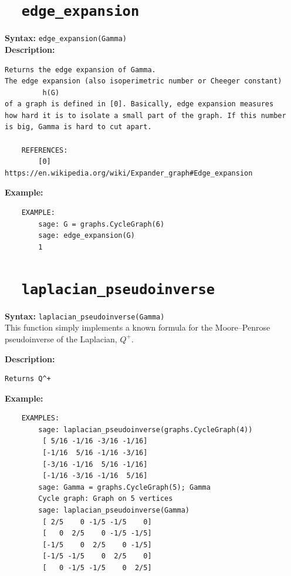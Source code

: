 \documentclass{article}
\begin{document}
\section{\tt \ \ edge\_expansion}

\textbf{Syntax:} \verb}edge_expansion(Gamma)}\\

\textbf{Description:}
\begin{verbatim}
Returns the edge expansion of Gamma.
The edge expansion (also isoperimetric number or Cheeger constant) 
         h(G) 
of a graph is defined in [0]. Basically, edge expansion measures 
how hard it is to isolate a small part of the graph. If this number 
is big, Gamma is hard to cut apart. 

    REFERENCES:
        [0] https://en.wikipedia.org/wiki/Expander_graph#Edge_expansion
\end{verbatim}

\textbf{Example:}
\begin{verbatim}
    EXAMPLE:
        sage: G = graphs.CycleGraph(6)
        sage: edge_expansion(G)
        1
\end{verbatim}

\section{\tt \ \ laplacian\_pseudoinverse}

\textbf{Syntax:} \verb}laplacian_pseudoinverse(Gamma)}\\

This function simply implements a known formula for the Moore–Penrose
pseudoinverse of the Laplacian, $Q^+$.

\textbf{Description:}
\begin{verbatim}
Returns Q^+
\end{verbatim}

\textbf{Example:}
\begin{verbatim}
    EXAMPLES:
        sage: laplacian_pseudoinverse(graphs.CycleGraph(4))
         [ 5/16 -1/16 -3/16 -1/16]
         [-1/16  5/16 -1/16 -3/16]
         [-3/16 -1/16  5/16 -1/16]
         [-1/16 -3/16 -1/16  5/16]
        sage: Gamma = graphs.CycleGraph(5); Gamma
        Cycle graph: Graph on 5 vertices
        sage: laplacian_pseudoinverse(Gamma)
         [ 2/5    0 -1/5 -1/5    0]
         [   0  2/5    0 -1/5 -1/5]
         [-1/5    0  2/5    0 -1/5]
         [-1/5 -1/5    0  2/5    0]
         [   0 -1/5 -1/5    0  2/5]
\end{verbatim}
\end{document}
